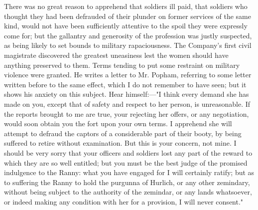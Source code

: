 There was no great reason to apprehend that soldiers ill paid, that soldiers who thought they had been defrauded of their plunder on former services of the same kind, would not have been sufficiently attentive to the spoil they were expressly come for; but the gallantry and generosity of the profession was justly suspected, as being likely to set bounds to military rapaciousness. The Company's first civil magistrate discovered the greatest uneasiness lest the women should have anything preserved to them. Terms tending to put some restraint on military violence were granted. He writes a letter to Mr. Popham, referring to some letter written before to the same effect, which I do not remember to have seen; but it shows his anxiety on this subject. Hear himself:—"I think every demand she has made on you, except that of safety and respect to her person, is unreasonable. If the reports brought to me are true, your rejecting her offers, or any negotiation, would soon obtain you the fort upon your own terms. I apprehend she will attempt to defraud the captors of a considerable part of their booty, by being suffered to retire without examination. But this is your concern, not mine. I should be very sorry that your officers and soldiers lost any part of the reward to which they are so well entitled; but you must be the best judge of the promised indulgence to the Ranny: what you have engaged for I will certainly ratify; but as to suffering the Ranny to hold the purgunna of Hurlich, or any other zemindary, without being subject to the authority of the zemindar, or any lands whatsoever, or indeed making any condition with her for a provision, I will never consent."

